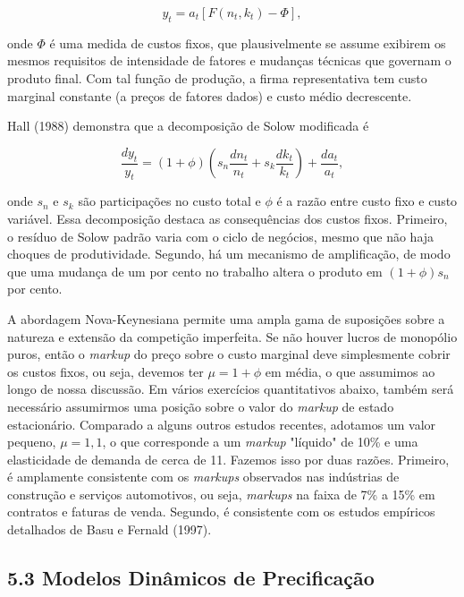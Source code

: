 \documentclass[12pt]{article}
\begin{document}
\begin{equation}
y_t = a_t [F(n_t, k_t) - \Phi], \tag{5.7}
\end{equation}

onde $\Phi$ é uma medida de custos fixos, que plausivelmente se assume exibirem os mesmos requisitos de intensidade de fatores e mudanças técnicas que governam o produto final. Com tal função de produção, a firma representativa tem custo marginal constante (a preços de fatores dados) e custo médio decrescente.

Hall (1988) demonstra que a decomposição de Solow modificada é

\begin{equation}
\frac{dy_t}{y_t} = (1 + \phi) \left( s_n \frac{dn_t}{n_t} + s_k \frac{dk_t}{k_t} \right) + \frac{da_t}{a_t}, \tag{5.8}
\end{equation}

onde $s_n$ e $s_k$ são participações no custo total e $\phi$ é a razão entre custo fixo e custo variável. Essa decomposição destaca as consequências dos custos fixos. Primeiro, o resíduo de Solow padrão varia com o ciclo de negócios, mesmo que não haja choques de produtividade. Segundo, há um mecanismo de amplificação, de modo que uma mudança de um por cento no trabalho altera o produto em $(1 + \phi)s_n$ por cento.

A abordagem Nova-Keynesiana permite uma ampla gama de suposições sobre a natureza e extensão da competição imperfeita. Se não houver lucros de monopólio puros, então o \textit{markup} do preço sobre o custo marginal deve simplesmente cobrir os custos fixos, ou seja, devemos ter $\mu = 1 + \phi$ em média, o que assumimos ao longo de nossa discussão. Em vários exercícios quantitativos abaixo, também será necessário assumirmos uma posição sobre o valor do \textit{markup} de estado estacionário. Comparado a alguns outros estudos recentes, adotamos um valor pequeno, $\mu = 1,1$, o que corresponde a um \textit{markup} "líquido" de 10\% e uma elasticidade de demanda de cerca de 11. Fazemos isso por duas razões. Primeiro, é amplamente consistente com os \textit{markups} observados nas indústrias de construção e serviços automotivos, ou seja, \textit{markups} na faixa de 7\% a 15\% em contratos e faturas de venda. Segundo, é consistente com os estudos empíricos detalhados de Basu e Fernald (1997).

\subsection{5.3 Modelos Dinâmicos de Precificação}
\end{document}
